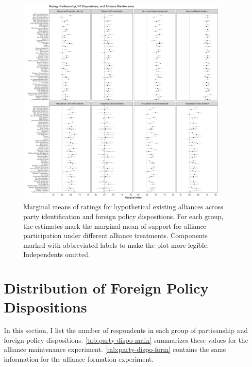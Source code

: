 \documentclass[12pt]{article}
\begin{document}
\begin{figure}
	\centering
		\includegraphics[width=0.95\textwidth]{party-dispo-mainapp.png}
	\caption{Marginal means of ratings for hypothetical existing alliances across party identification and foreign policy dispositions. For each group, the estimates mark the marginal mean of support for alliance participation under different alliance treatments. Components marked with abbreviated labels to make the plot more legible. Independents omitted.}
	\label{fig:party-dispo-main}
\end{figure}


\newpage 

\section{Distribution of Foreign Policy Dispositions}

In this section, I list the number of respondents in each group of partisanship and foreign policy dispositions. 
\autoref{tab:party-dispo-main} summarizes these values for the alliance maintenance experiment. 
\autoref{tab:party-dispo-form} contains the same information for the alliance formation experiment. 
\end{document}
